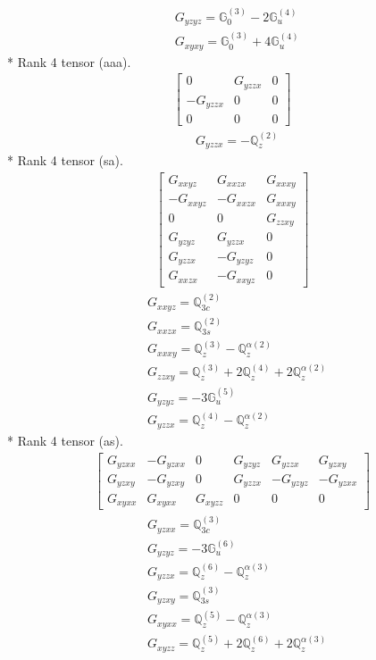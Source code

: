 \documentclass[fleqn,8pt,landscape]{jsarticle}
\begin{document}
\begin{align*}
& G_{yzyz} = \mathbb{G}_{0}^{(3)} - 2 \mathbb{G}_{u}^{(4)} \\
& G_{xyxy} = \mathbb{G}_{0}^{(3)} + 4 \mathbb{G}_{u}^{(4)}
\end{align*}
* Rank 4 tensor (aaa).
\begin{align*}
\begin{bmatrix} 0 & G_{yzzx} & 0 \\ - G_{yzzx} & 0 & 0 \\ 0 & 0 & 0 \end{bmatrix}
\end{align*}
\begin{align*}
& G_{yzzx} = - \mathbb{Q}_{z}^{(2)}
\end{align*}
* Rank 4 tensor (sa).
\begin{align*}
\begin{bmatrix} G_{xxyz} & G_{xxzx} & G_{xxxy} \\ - G_{xxyz} & - G_{xxzx} & G_{xxxy} \\ 0 & 0 & G_{zzxy} \\ G_{yzyz} & G_{yzzx} & 0 \\ G_{yzzx} & - G_{yzyz} & 0 \\ G_{xxzx} & - G_{xxyz} & 0 \end{bmatrix}
\end{align*}
\begin{align*}
& G_{xxyz} = \mathbb{Q}_{3c}^{(2)} \\
& G_{xxzx} = \mathbb{Q}_{3s}^{(2)} \\
& G_{xxxy} = \mathbb{Q}_{z}^{(3)} - \mathbb{Q}_{z}^{\alpha(2)} \\
& G_{zzxy} = \mathbb{Q}_{z}^{(3)} + 2 \mathbb{Q}_{z}^{(4)} + 2 \mathbb{Q}_{z}^{\alpha(2)} \\
& G_{yzyz} = - 3 \mathbb{G}_{u}^{(5)} \\
& G_{yzzx} = \mathbb{Q}_{z}^{(4)} - \mathbb{Q}_{z}^{\alpha(2)}
\end{align*}
* Rank 4 tensor (as).
\begin{align*}
\begin{bmatrix} G_{yzxx} & - G_{yzxx} & 0 & G_{yzyz} & G_{yzzx} & G_{yzxy} \\ G_{yzxy} & - G_{yzxy} & 0 & G_{yzzx} & - G_{yzyz} & - G_{yzxx} \\ G_{xyxx} & G_{xyxx} & G_{xyzz} & 0 & 0 & 0 \end{bmatrix}
\end{align*}
\begin{align*}
& G_{yzxx} = \mathbb{Q}_{3c}^{(3)} \\
& G_{yzyz} = - 3 \mathbb{G}_{u}^{(6)} \\
& G_{yzzx} = \mathbb{Q}_{z}^{(6)} - \mathbb{Q}_{z}^{\alpha(3)} \\
& G_{yzxy} = \mathbb{Q}_{3s}^{(3)} \\
& G_{xyxx} = \mathbb{Q}_{z}^{(5)} - \mathbb{Q}_{z}^{\alpha(3)} \\
& G_{xyzz} = \mathbb{Q}_{z}^{(5)} + 2 \mathbb{Q}_{z}^{(6)} + 2 \mathbb{Q}_{z}^{\alpha(3)}
\end{align*}
\end{document}
